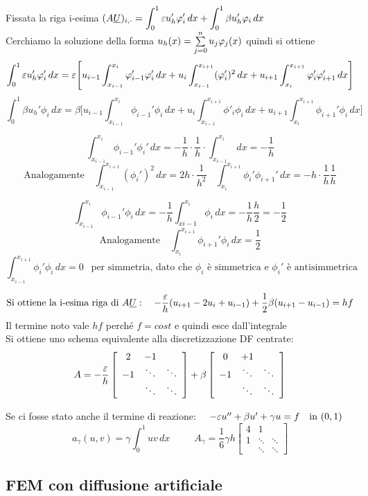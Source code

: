 \documentclass{article}
\renewcommand{\vv}[1]{\underline{#1}}
\newcommand{\tridiag}[3]{\left[\begin{array}{ccc}
     #2 & #3 &  \\
     #1 & \ddots & \ddots \\
     & \ddots & \ddots
\end{array}\right] }
\begin{document}
Fissata la riga i-esima $(A\vv{U})_{i,\cdot} = \int_0^1 \eps u'_h \phi_i'\, dx + \int_0^1 \beta u_h' \phi_i\, dx$\\
Cerchiamo la soluzione della forma $u_h(x)=\sum\limits_{j=0}^{n} u_j \varphi_j(x)$ quindi si ottiene
\[
\int_0^1 \eps u'_h \phi_i'\, dx = \eps \Bigg[ u_{i-1} \int_{x_{i-1}}^{x_i} \phi_{i-1}'\phi'_i \, dx + u_i \int_{x_{i-1}}^{x_{i+1}} (\phi'_i)^2\, dx + u_{i+1} \int_{x_i}^{x_{i+1}} \phi_i'\phi'_{i+1} \, dx \Bigg]
\]
\[
\int_0^1 \beta u_h' \phi_i\, dx=\beta \Bigg[ u_{i-1} \int_{x_{i-1}}^{x_i} \phi_{i-1}'\phi_i \, dx + u_i \int_{x_{i-1}}^{x_{i+1}} \phi'_i\phi_i\, dx + u_{i+1} \int_{x_i}^{x_{i+1}} \phi_{i+1}'\phi_{i} \, dx \Bigg]
\]


\[
\int_{x_{i-1}}^{x_{i}}\phi_{i-1}'\phi_{i}'\, dx = -\frac{1}{h} \cdot \frac{1}{h} \cdot \int_{x_{i-1}}^{x_{i}} \, dx = -\frac{1}{h} 
\]
\[
\text{Analogamente } \ \ \ \int_{x_{i-1}}^{x_{i+1}}(\phi_{i}')^2\, dx = 2h \cdot \frac{1}{h^2} \ \ \ \ \int_{x_{i}}^{x_{i+1}}\phi_{i}'\phi_{i+1}'\, dx = -h\cdot \frac{1}{h}\frac{1}{h}
\]

\[
\int_{x_{i-1}}^{x_{i}}\phi_{i-1}'\phi_{i}\, dx = -\frac{1}{h} \int_{x{i-1}}^{x_i}\phi_i\, dx = -\frac{1}{h}\frac{h}{2} = -\frac{1}{2}
\]
\[
\text{Analogamente } \ \ \ \int_{x_{i}}^{x_{i+1}}\phi_{i+1}'\phi_{i}\, dx = \frac12
\]
\[
\int_{x_{i-1}}^{x_{i+1}}\phi_{i}'\phi_{i}\, dx = 0 \ \ \text{ per simmetria, dato che } \phi_i \text{ è simmetrica e } \phi_i' \text{ è antisimmetrica}
\]

\[
\text{Si ottiene la i-esima riga di } A\vv{U}: \ \ \ -\frac{\eps}{h} (u_{i+1}-2u_i + u_{i-1}) + \frac{1}{2} \beta (u_{i+1}-u_{i-1}) = hf
\]
Il termine noto vale $hf$ perché $f=cost$ e quindi esce dall'integrale\\

Si ottiene uno schema equivalente alla discretizzazione DF centrate:
\[
A= - \frac{\eps}{h} \tridiag{-1}{2}{-1} +\beta \tridiag{-1}{0}{+1}
\]
\phantom{}

Se ci fosse stato anche il termine di reazione: \ \ $-\varepsilon u'' + \beta u' + \gamma u = f \ \ \text{ in } (0,1)$
\[
a_{\gamma}(u,v)= \gamma \int_0^1 uv\, dx \hspace{30pt} A_{\gamma} = \frac{1}{6} \gamma h \tridiag{1}{4}{1}
\]
\phantom{}


\subsection{FEM con diffusione artificiale}
\end{document}
